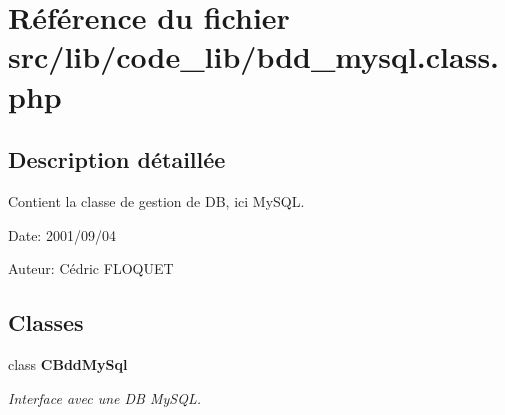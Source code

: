 \section{Référence du fichier src/lib/code\_\-lib/bdd\_\-mysql.class.php}
\label{bdd__mysql_8class_8php}


\subsection{Description détaillée}
Contient la classe de gestion de DB, ici MySQL. 

\begin{Desc}
\item[Date:]2001/09/04\end{Desc}
\begin{Desc}
\item[Auteur:]Cédric FLOQUET \end{Desc}


\subsection*{Classes}
\begin{CompactItemize}
\item 
class {\bf CBddMySql}
\begin{CompactList}\small\item\em Interface avec une DB MySQL. \item\end{CompactList}\end{CompactItemize}
